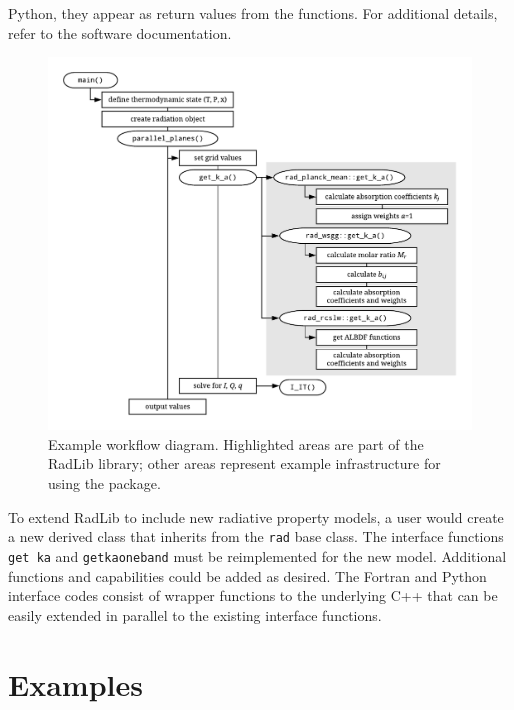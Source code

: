 \documentclass[preprint,12pt]{elsarticle}
\begin{document}
    Python, they appear as return values from the functions. For additional details, refer to the software
    documentation.
%
    \begin{figure}
        \begin{center}
            \includegraphics[width=\textwidth]{fig_radlib_structure.pdf}
        \end{center}
        \caption{Example workflow diagram. Highlighted areas are part of the RadLib library; other areas represent example infrastructure for using the package.}
        \label{fig:flowchart}
    \end{figure}
%

    To extend RadLib to include new radiative property models, a user would create a new derived class
    that inherits from the \texttt{rad} base class. The interface functions \texttt{get\textunderscore
    k\textunderscore a} and \texttt{get\textunderscore k\textunderscore a\textunderscore oneband} must be
    reimplemented for the new model. Additional functions and capabilities could be added as desired. The Fortran and
    Python interface codes consist of wrapper functions to the underlying C++ that can be easily extended in parallel
    to the existing interface functions.



    \section{Examples} \label{s:Examples}
\end{document}
